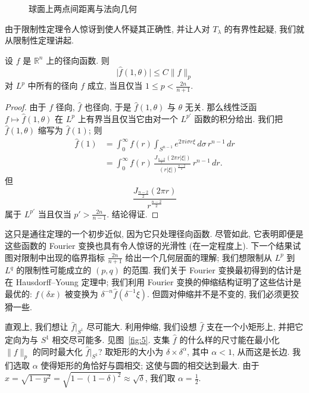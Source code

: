 \begin{figure}[htbp]
\centering
{}
\caption{球面上两点间距离与法向几何}
\label{fig:4}
\end{figure}

由于限制性定理令人惊讶到使人怀疑其正确性, 并让人对 $T_{\lambda}$ 的有界性起疑, 我们就从限制性定理讲起.

\begin{proposition}\label{prop:6.1}
设 $f$ 是 $\mathbb{R}^n$ 上的径向函数. 则
\[
\bigl|\hat{f}(1,\theta)\bigr|\leq C\|f\|_{p}
\]
对 $L^p$ 中所有的径向 $f$ 成立, 当且仅当 $1\leq p<\frac{2n}{n+1}$.
\end{proposition}

\begin{proof}
由于 $f$ 径向, $\hat{f}$ 也径向, 于是 $\hat{f}(1,\theta)$ 与 $\theta$ 无关. 那么线性泛函 $f\mapsto\hat{f}(1,\theta)$ 在 $L^p$ 上有界当且仅当它由对一个 $L^{p'}$ 函数的积分给出. 我们把 $\hat{f}(1,\theta)$ 缩写为 $\hat{f}(1)$; 则
\begin{align*}
\hat{f}(1)&=\int_{0}^{\infty}f(r)\int_{S^{n-1}}e^{2\pi i\sigma r\xi}\,d\sigma\,r^{n-1}\,dr \\
&=\int_{0}^{\infty}f(r)\,\frac{J_{\frac{n-2}{2}}(2\pi r|\xi|)}{(r|\xi|)^{\frac{n-2}{2}}}\,r^{n-1}\,dr.
\end{align*}
但
\[
\frac{J_{\frac{n-2}{2}}(2\pi r)}{r^{\frac{n-2}{2}}}
\]
属于 $L^{p'}$ 当且仅当 $p'>\frac{2n}{n-1}$. 结论得证.
\end{proof}

这只是通往定理的一个初步近似, 因为它只处理径向函数. 尽管如此, 它表明即便是这些函数的 Fourier 变换也具有令人惊讶的光滑性 (在一定程度上). 下一个结果试图对限制中出现的临界指标 $\frac{2n}{n+1}$ 给出一个几何层面的理解; 我们想限制从 $L^p$ 到 $L^q$ 的限制性可能成立的 $(p,q)$ 的范围. 我们关于 Fourier 变换最初得到的估计是在 Hausdorff--Young 定理中; 我们利用 Fourier 变换的伸缩结构证明了这些估计是最优的: $f(\delta x)$ 被变换为 $\delta^{-n}\hat{f}(\delta^{-1}\xi)$. 但圆对伸缩并不是不变的, 我们必须更狡猾一些.

直观上, 我们想让 $\hat{f}|_{S^1}$ 尽可能大. 利用伸缩, 我们设想 $\hat{f}$ 支在一个小矩形上, 并把它定向为与 $S^1$ 相交尽可能多. 见图~\ref{fig:5}. 支集 $\hat{f}$ 的什么样的尺寸能在最小化 $\|f\|_p$ 的同时最大化 $\hat{f}|_{S^1}$? 取矩形的大小为 $\delta\times\delta^{\alpha}$, 其中 $\alpha<1$, 从而这是长边. 我们选取 $\alpha$ 使得矩形的角恰好与圆相交; 这使与圆的相交达到最大. 由于 $x=\sqrt{1-y^2}=\sqrt{1-(1-\delta)^2}\approx\sqrt{\delta}$, 我们取 $\alpha=\frac{1}{2}$.

